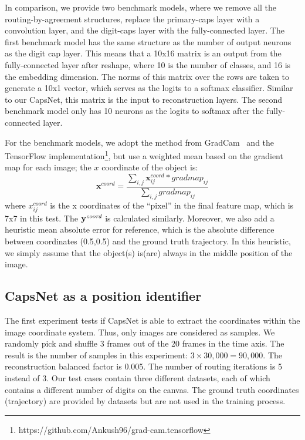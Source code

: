 \documentclass{article}
\begin{document}
In comparison, we provide two benchmark models, where we remove all the routing-by-agreement structures, replace the primary-caps layer with a convolution layer, and the digit-caps layer with the fully-connected layer. The first benchmark model has the same structure as the number of output neurons as the digit cap layer. This means that a 10x16 matrix is an output from the fully-connected layer after reshape, where 10 is the number of classes, and 16 is the embedding dimension. The norms of this matrix over the rows are taken to generate a 10x1 vector, which serves as the logits to a softmax classifier. Similar to our CapsNet, this matrix is the input to reconstruction layers. The second benchmark model only has 10 neurons as the logits to softmax after the fully-connected layer.

For the benchmark models, we adopt the method from GradCam~\cite{selvaraju2016grad} and the TensorFlow implementation\footnote{https://github.com/Ankush96/grad-cam.tensorflow}, but use a weighted mean based on the gradient map for each image; the $x$ coordinate of the object is: 
\begin{equation}
\textbf{x}^\textit{coord} = \frac{\sum_{i,j} \textbf{x}^\textit{coord}_{ij} * \textit{gradmap}_{ij}}{\sum_{i,j} \textit{gradmap}_{ij}} 
\end{equation}
where $x^\textit{coord}_{ij}$ is the x coordinates of the ``pixel'' in the final feature map, which is 7x7 in this test. The $\bold{y}^\textit{coord}$ is calculated similarly. Moreover, we also add a heuristic mean absolute error for reference, which is the absolute difference between coordinates (0.5,0.5) and the ground truth trajectory. In this heuristic, we simply assume that the object(s) is(are) always in the middle position of the image.

\subsection{CapsNet as a position identifier\label{sec:exp_caps}}
The first experiment tests if CapsNet is able to extract the coordinates within the image coordinate system. Thus, only images are considered as samples. We randomly pick and shuffle 3 frames out of the 20 frames in the time axis. The result is the number of samples in this experiment: $3\times 30,000=90,000$. The reconstruction balanced factor is 0.005. The number of routing iterations is 5 instead of 3. Our test cases contain three different datasets, each of which contains a different number of digits on the canvas. The ground truth coordinates (trajectory) are provided by datasets but are not used in the training process.
\end{document}
